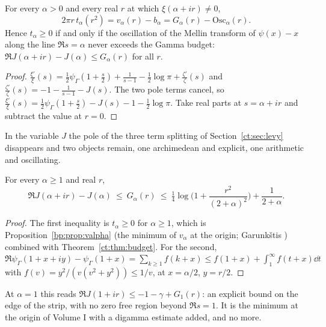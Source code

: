\begin{theorem}\label{ct:thm:budget}
For every $\alpha>0$ and every real $r$ at which $\xi(\alpha+ir)\ne0$,
\[
2\pi r\,t_\alpha(r^2)=v_\alpha(r)-b_\alpha=G_\alpha(r)-\mathrm{Osc}_\alpha(r).
\]
Hence $t_\alpha\ge0$ if and only if the oscillation of the Mellin transform of $\psi(x)-x$ along the line $\Re s=\alpha$ never exceeds the Gamma budget: $\Re J(\alpha+ir)-J(\alpha)\le G_\alpha(r)$ for all $r$.
\end{theorem}
\begin{proof}
$\frac{\xi'}{\xi}(s)=\frac12\psi_\Gamma(1+\frac s2)+\frac1{s-1}-\frac12\log\pi+\frac{\zeta'}{\zeta}(s)$ and $\frac{\zeta'}{\zeta}(s)=-1-\frac1{s-1}-J(s)$. The two pole terms cancel, so $\frac{\xi'}{\xi}(s)=\frac12\psi_\Gamma(1+\frac s2)-J(s)-1-\frac12\log\pi$. Take real parts at $s=\alpha+ir$ and subtract the value at $r=0$.
\end{proof}
In the variable $J$ the pole of the three term splitting of Section~\ref{ct:sec:levy} disappears and two objects remain, one archimedean and explicit, one arithmetic and oscillating.
\begin{corollary}\label{ct:cor:oscbound}
For every $\alpha\ge1$ and real $r$,
\[
\Re J(\alpha+ir)-J(\alpha)\ \le\ G_\alpha(r)\ \le\ \tfrac14\log\Big(1+\frac{r^2}{(2+\alpha)^2}\Big)+\frac{1}{2+\alpha} .
\]
\end{corollary}
\begin{proof}
The first inequality is $t_\alpha\ge0$ for $\alpha\ge1$, which is Proposition~\ref{bp:prop:valpha} (the minimum of $v_\alpha$ at the origin; Garunk\v{s}tis \cite{Garunkstis02}) combined with Theorem~\ref{ct:thm:budget}. For the second, $\Re\psi_\Gamma(1+x+iy)-\psi_\Gamma(1+x)=\sum_{k\ge1}f(k+x)\le f(1+x)+\int_1^\infty f(t+x)\dd t$ with $f(v)=y^2/(v(v^2+y^2))\le1/v$, at $x=\alpha/2$, $y=r/2$.
\end{proof}
At $\alpha=1$ this reads $\Re J(1+ir)\le-1-\gamma+G_1(r)$: an explicit bound on the edge of the strip, with no zero free region beyond $\Re s=1$. It is the minimum at the origin of Volume I with a digamma estimate added, and no more.

